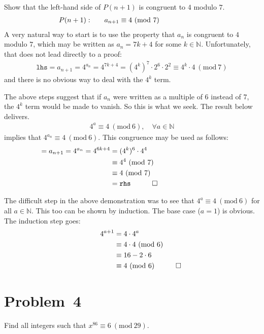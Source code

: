 \documentclass[12pt]{article}
\newcommand{\modulo}[1]{~(\mathrm{mod}~#1)}
\begin{document}

Show that the left-hand side of $P(n+1)$ is congruent to $4$ modulo $7$. 
\begin{align*}
\mathllap{P(n+1): \hspace{2em}}
  a_{n+1} \equiv 4 \modulo{7}
\end{align*}
A very natural way to start is to use the property that $a_{n}$ is congruent to $4$ modulo $7$, which may be written as $a_{n}=7k+4$ for some $k\in\mathbb{N}$. Unfortunately, that does not lead directly to a proof:
\begin{align*}
\texttt{lhs} 
  = a_{n+1} 
  = 4^{a_{n}} 
  = 4^{7k+4} 
  = (4^{k})^{7} \cdot 2^{6} \cdot 2^{2} 
  \equiv 4^{k} \cdot 4 \modulo{7}
\end{align*}
and there is no obvious way to deal with the $4^{k}$ term.

The above steps suggest that if $a_{n}$ were written as a multiple of $6$ instead of $7$, the $4^{k}$ term would be made to vanish. So this is what we seek. The result below delivers.
\begin{align*}
4^{a} \equiv 4 \modulo{6}, \quad \forall a \in\mathbb{N}
\end{align*}
implies that $4^{a_{n}}\equiv4\modulo{6}$. This congruence may be used as follows:
\begin{align*}
\mathllap{
\texttt{lhs} 
  = a_{n+1} 
  = 4^{a_{n}} 
  = 4^{6k+4} 
}
  & = (4^{k})^{6} \cdot 4^{4} \\
  & \equiv 4^{4} \modulo{7} \\
  & \equiv 4 \modulo{7} \\
  & = \texttt{rhs} \mathrlap{\quad \qed}
\end{align*}

The difficult step in the above demonstration was to see that $4^{a} \equiv 4 \modulo{6}$ for all $a\in\mathbb{N}$. This too can be shown by induction. The base case ($a=1$) is obvious. The induction step goes:
\begin{align*}
4^{a+1} 
  & = 4 \cdot 4^{a} \\
  & \equiv 4 \cdot 4 \modulo{6} \\
  & \equiv 16 - 2 \cdot 6 \\
  & \equiv 4 \modulo{6} \mathrlap{\quad \qed}
\end{align*}


\clearpage
\section*{Problem~4}
\begin{question}
Find all integers such that $x^{86}\equiv6\modulo{29}$.
\end{question}
\end{document}
